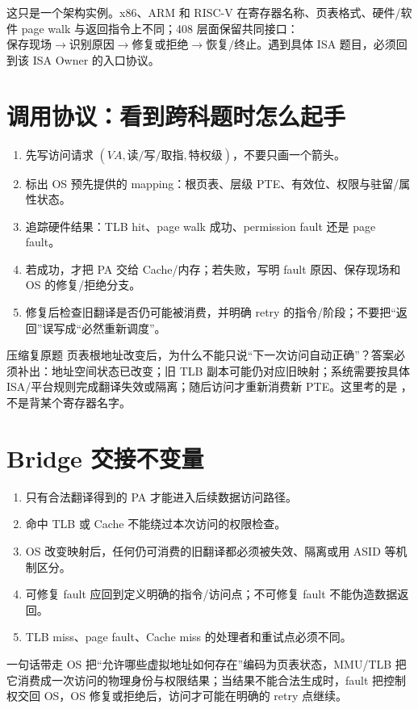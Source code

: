 \documentclass[UTF8,fontset=none,11pt,a4paper]{ctexart}
\begin{document}
这只是一个架构实例。x86、ARM 和 RISC-V 在寄存器名称、页表格式、硬件/软件 page walk 与返回指令上不同；408 层面保留共同接口：\(\text{保存现场}\to\text{识别原因}\to\text{修复或拒绝}\to\text{恢复/终止}\)。遇到具体 ISA 题目，必须回到该 ISA Owner 的入口协议。

\section{调用协议：看到跨科题时怎么起手}
\begin{enumerate}
\item 先写访问请求 \((VA,读/写/取指,特权级)\)，不要只画一个箭头。
\item 标出 OS 预先提供的 mapping：根页表、层级 PTE、有效位、权限与驻留/属性状态。
\item 追踪硬件结果：TLB hit、page walk 成功、permission fault 还是 page fault。
\item 若成功，才把 PA 交给 Cache/内存；若失败，写明 fault 原因、保存现场和 OS 的修复/拒绝分支。
\item 修复后检查旧翻译是否仍可能被消费，并明确 retry 的指令/阶段；不要把“返回”误写成“必然重新调度”。
\end{enumerate}

\begin{examplebox}{压缩复原题}
页表根地址改变后，为什么不能只说“下一次访问自动正确”？答案必须补出：地址空间状态已改变；旧 TLB 副本可能仍对应旧映射；系统需要按具体 ISA/平台规则完成翻译失效或隔离；随后访问才重新消费新 PTE。这里考的是 ，不是背某个寄存器名字。
\end{examplebox}

\section{Bridge 交接不变量}
\begin{enumerate}
\item {}只有合法翻译得到的 PA 才能进入后续数据访问路径。
\item {}命中 TLB 或 Cache 不能绕过本次访问的权限检查。
\item {}OS 改变映射后，任何仍可消费的旧翻译都必须被失效、隔离或用 ASID 等机制区分。
\item {}可修复 fault 应回到定义明确的指令/访问点；不可修复 fault 不能伪造数据返回。
\item {}TLB miss、page fault、Cache miss 的处理者和重试点必须不同。
\end{enumerate}

\begin{corebox}{一句话带走}
OS 把“允许哪些虚拟地址如何存在”编码为页表状态，MMU/TLB 把它消费成一次访问的物理身份与权限结果；当结果不能合法生成时，fault 把控制权交回 OS，OS 修复或拒绝后，访问才可能在明确的 retry 点继续。
\end{corebox}
\end{document}
